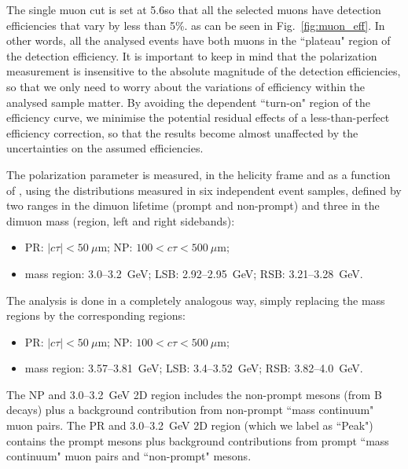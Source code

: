 The single muon \pt cut is set at 5.6\GeV so that all the selected muons have detection efficiencies
that vary by less than 5\%. as can be seen in Fig.~\ref{fig:muon_eff}.
In other words, all the analysed events have both muons in the ``plateau" region of the
detection efficiency.
It is important to keep in mind that the polarization measurement is insensitive to 
the absolute magnitude of the detection efficiencies, so that we only need to worry about the 
variations of efficiency within the analysed sample matter.
By avoiding the \pt dependent ``turn-on" region of the efficiency curve,
we minimise the potential residual effects of a less-than-perfect efficiency correction,
so that the results become almost unaffected by the uncertainties on the assumed efficiencies.


The \jpsi polarization parameter \lth is measured, in the helicity frame and as a function of \pt, 
using the \abscosth distributions measured in six independent event samples, 
defined by two ranges in the dimuon lifetime (prompt and non-prompt) 
and three in the dimuon mass (\jpsi region, left and right sidebands):

\begin{itemize}

\item PR: $|c\tau| < 50~\mu$m; NP: $100 < c\tau < 500~\mu$m;

\item \jpsi mass region: 3.0--3.2~GeV; LSB: 2.92--2.95~GeV; RSB: 3.21--3.28~GeV.

\end{itemize}

The \psip analysis is done in a completely analogous way, simply replacing the 
\jpsi mass regions by the corresponding \psip regions:

\begin{itemize}

\item PR: $|c\tau| < 50~\mu$m; NP: $100 < c\tau < 500~\mu$m;

\item \psip mass region: 3.57--3.81~GeV; LSB: 3.4--3.52~GeV; RSB: 3.82--4.0~GeV.

\end{itemize}

The NP and 3.0--3.2~GeV 2D region includes the non-prompt \jpsi mesons (from B decays) 
plus a background contribution from non-prompt ``mass continuum" muon pairs.
The PR and 3.0--3.2~GeV 2D region (which we label as ``Peak") 
contains the prompt \jpsi mesons plus background contributions from prompt 
``mass continuum" muon pairs and ``non-prompt" \jpsi mesons.


